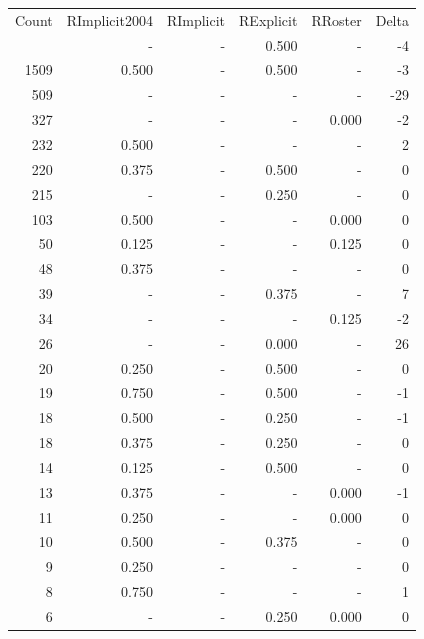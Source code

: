 \documentclass[a4paper]{article}\usepackage{graphicx, color}
\begin{document}
\begin{table}[ht]
\centering
\begin{tabular}{rrrrrr}
  \hline
Count & RImplicit2004 & RImplicit & RExplicit & RRoster & Delta \\ 
  \rowcolor{sosoColor}  \hline
1797 & - & - & 0.500 & - & -4 \\ 
   \rowcolor{sosoColor} 1509 & 0.500 & - & 0.500 & - & -3 \\ 
   \rowcolor{nullColor} 509 & - & - & - & - & -29 \\ 
   \rowcolor{nullColor} 327 & - & - & - & 0.000 & -2 \\ 
   \rowcolor{nullColor} 232 & 0.500 & - & - & - & 2 \\ 
   \rowcolor{sosoColor} 220 & 0.375 & - & 0.500 & - & 0 \\ 
   \rowcolor{sosoColor} 215 & - & - & 0.250 & - & 0 \\ 
   \rowcolor{nullColor} 103 & 0.500 & - & - & 0.000 & 0 \\ 
   \rowcolor{nullColor} 50 & 0.125 & - & - & 0.125 & 0 \\ 
   \rowcolor{nullColor} 48 & 0.375 & - & - & - & 0 \\ 
   \rowcolor{sosoColor} 39 & - & - & 0.375 & - & 7 \\ 
   \rowcolor{nullColor} 34 & - & - & - & 0.125 & -2 \\ 
   \rowcolor{sosoColor} 26 & - & - & 0.000 & - & 26 \\ 
   \rowcolor{sosoColor} 20 & 0.250 & - & 0.500 & - & 0 \\ 
   \rowcolor{sosoColor} 19 & 0.750 & - & 0.500 & - & -1 \\ 
   \rowcolor{sosoColor} 18 & 0.500 & - & 0.250 & - & -1 \\ 
   \rowcolor{sosoColor} 18 & 0.375 & - & 0.250 & - & 0 \\ 
   \rowcolor{sosoColor} 14 & 0.125 & - & 0.500 & - & 0 \\ 
   \rowcolor{nullColor} 13 & 0.375 & - & - & 0.000 & -1 \\ 
   \rowcolor{nullColor} 11 & 0.250 & - & - & 0.000 & 0 \\ 
   \rowcolor{sosoColor} 10 & 0.500 & - & 0.375 & - & 0 \\ 
   \rowcolor{nullColor} 9 & 0.250 & - & - & - & 0 \\ 
   \rowcolor{nullColor} 8 & 0.750 & - & - & - & 1 \\ 
   \rowcolor{sosoColor} 6 & - & - & 0.250 & 0.000 & 0 \\ 

\end{tabular}
\end{table}
\end{document}
